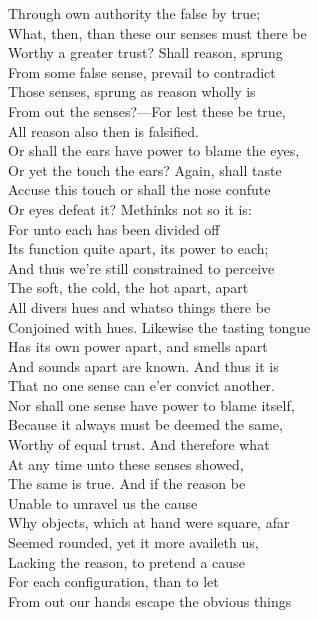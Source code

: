 Through own authority the false by true;\\
What, then, than these our senses must there be\\
Worthy a greater trust? Shall reason, sprung\\
From some false sense, prevail to contradict\\
Those senses, sprung as reason wholly is\\
From out the senses?—For lest these be true,\\
All reason also then is falsified.\\
Or shall the ears have power to blame the eyes,\\
Or yet the touch the ears? Again, shall taste\\
Accuse this touch or shall the nose confute\\
Or eyes defeat it? Methinks not so it is:\\
For unto each has been divided off\\
Its function quite apart, its power to each;\\
And thus we're still constrained to perceive\\
The soft, the cold, the hot apart, apart\\
All divers hues and whatso things there be\\
Conjoined with hues. Likewise the tasting tongue\\
Has its own power apart, and smells apart\\
And sounds apart are known. And thus it is\\
That no one sense can e'er convict another.\\
Nor shall one sense have power to blame itself,\\
Because it always must be deemed the same,\\
Worthy of equal trust. And therefore what\\
At any time unto these senses showed,\\
The same is true. And if the reason be\\
Unable to unravel us the cause\\
Why objects, which at hand were square, afar\\
Seemed rounded, yet it more availeth us,\\
Lacking the reason, to pretend a cause\\
For each configuration, than to let\\
From out our hands escape the obvious things\\
